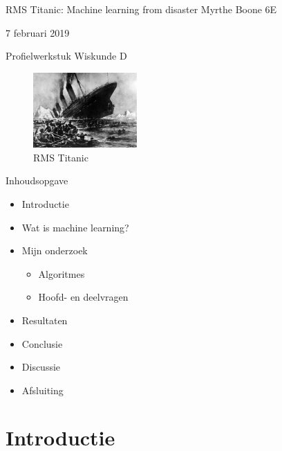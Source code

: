 \documentclass[presentation]{beamer}
\author{Jan Boone}
\date{\today}
\title{}
\begin{document}
\begin{frame}[label={sec:org09dbb08}]{RMS Titanic: Machine learning from disaster}
Myrthe Boone 6E

7 februari 2019

Profielwerkstuk Wiskunde D  

\begin{figure}[htbp]
\centering
\includegraphics[width=150]{./Titanic.png}
\caption{RMS Titanic}
\end{figure}
\end{frame}

\begin{frame}[label={sec:org06908ed}]{Inhoudsopgave}
\begin{itemize}
\item Introductie
\item Wat is machine learning?
\item Mijn onderzoek
\begin{itemize}
\item Algoritmes
\item Hoofd- en deelvragen
\end{itemize}
\item Resultaten
\item Conclusie
\item Discussie
\item Afsluiting
\end{itemize}
\end{frame}

\section*{Introductie}
\label{sec:orgb0d6435}
\end{document}
